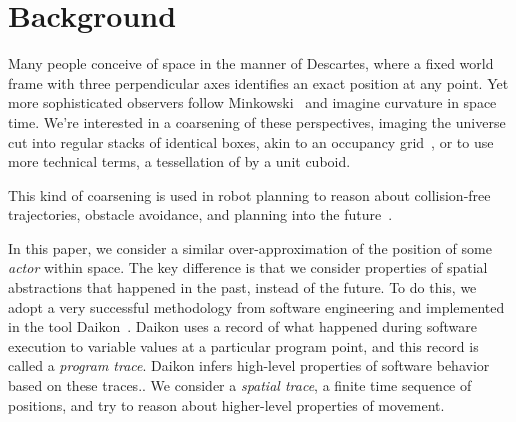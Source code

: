 \section{Background}
\label{sec:background}

Many people conceive of space in the manner of Descartes, where a fixed world frame with three perpendicular axes identifies an exact position at any point.  
Yet more sophisticated observers follow Minkowski~\cite{minkowski1952space} and imagine curvature in space time.
We're interested in a coarsening of these perspectives, imaging the universe cut into regular stacks of identical boxes, akin to an occupancy grid~\cite{moravec1985high}, or to use more technical terms, a tessellation of \rthree by a unit cuboid.



This kind of coarsening is used in robot planning to reason about collision-free trajectories, obstacle avoidance, and planning into the future~\cite{siegwart2011introduction}.

In this paper, we consider a similar over-approximation of the position of some \emph{actor} within space. 
The key difference is that we consider properties of spatial abstractions that happened in the past, instead of the future.
To do this, we adopt a very successful methodology from software engineering and implemented in the tool Daikon~\cite{kataoka2001automated}.
Daikon uses a record of what happened during software execution to variable values at a particular program point, and this record is called a \emph{program trace}.  Daikon infers high-level properties of software behavior based on these traces..
We consider a \emph{spatial trace}, a finite time sequence of positions, and try to reason about higher-level properties of movement.


